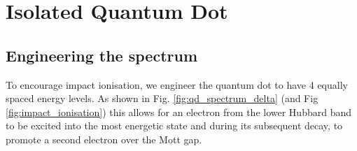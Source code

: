 \section{Isolated Quantum Dot}
\subsection{Engineering the spectrum}\label{subsec:spectrum_engineering}

To encourage impact ionisation, we engineer the quantum dot to have 4 equally spaced energy levels. As shown in Fig. \ref{fig:qd_spectrum_delta} (and Fig \ref{fig:impact_ionisation}) this allows for an electron from the lower Hubbard band to be excited into the most energetic state and during its subsequent decay, to promote a second electron over the Mott gap.
\newline

